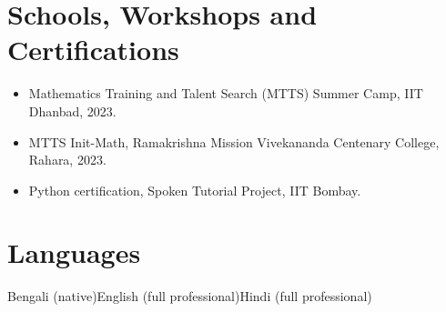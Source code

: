 \documentclass[10pt,a4paper]{article}
\newcommand{\sep}{\enspace{\color{rulecol}|}\enspace}
\begin{document}
\section{Schools, Workshops and Certifications}
\begin{itemize}
  \item Mathematics Training and Talent Search (MTTS) Summer Camp, IIT Dhanbad, 2023.
  \item MTTS Init-Math, Ramakrishna Mission Vivekananda Centenary College, Rahara, 2023.
  \item Python certification, Spoken Tutorial Project, IIT Bombay.
\end{itemize}

\section{Languages}
Bengali (native)\sep English (full professional)\sep Hindi (full professional)
\end{document}
